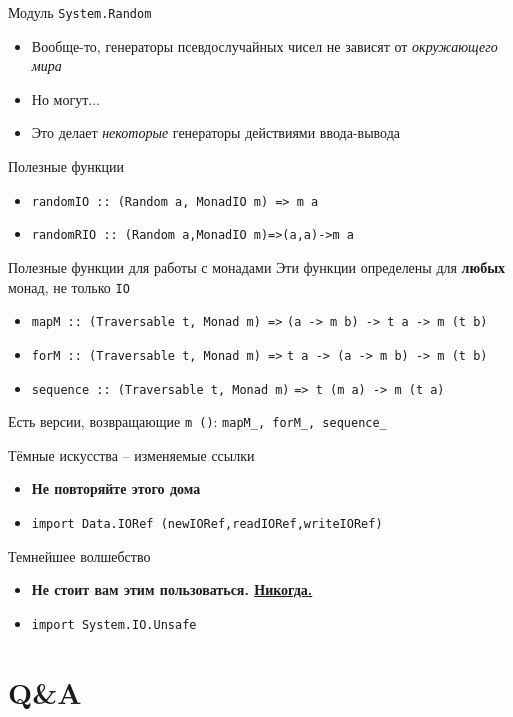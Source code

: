 \documentclass{beamer}
\newcommand{\hs}[1]{\texttt{#1}}
\begin{document}
\begin{frame}{Модуль \texttt{System.Random}}
    \begin{itemize}
        \item Вообще-то, генераторы псевдослучайных чисел не зависят от \textit{окружающего мира}
        \pause\item Но могут...
        \pause\item Это делает \textit{некоторые} генераторы действиями ввода-вывода
    \end{itemize}
    \pause
    \pause\begin{block}{Полезные функции}
        \begin{itemize}
            \item \hs{randomIO :: (Random a, MonadIO m) => m a}
            \item \hs{randomRIO :: (Random a,MonadIO m)=>(a,a)->m a}
        \end{itemize}
    \end{block}
\end{frame}
\begin{frame}{Полезные функции для работы с монадами}
    Эти функции определены для \textbf{любых} монад, не только \hs{IO}

    \begin{itemize}
    \item \hs{mapM :: (Traversable t, Monad m) =>} \hs{(a -> m b) -> t a -> m (t b)}
    \item \hs{forM :: (Traversable t, Monad m) =>} \hs{t a -> (a -> m b) -> m (t b)}
    \item \hs{sequence :: (Traversable t, Monad m)} \hs{=> t (m a) -> m (t a)}
    \end{itemize}
    Есть версии, возвращающие \hs{m ()}:  \texttt{mapM\_, forM\_, sequence\_}
  \end{frame}
  \begin{frame}{Тёмные искусства -- изменяемые ссылки}
      \begin{itemize}
          \item \textbf{Не повторяйте этого дома}
          \item \hs{import Data.IORef (newIORef,readIORef,writeIORef)}
      \end{itemize}
  \end{frame}
  \begin{frame}{Темнейшее волшебство}
      \begin{itemize}
          \item \textbf{Не стоит вам этим пользоваться. \underline{Никогда.}}
          \pause\item \hs{import System.IO.Unsafe}
      \end{itemize}
  \end{frame}
  \section{Q\&A}
\end{document}
